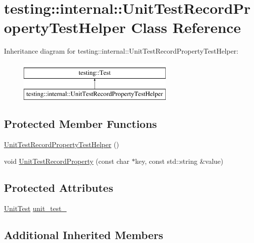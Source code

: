 \hypertarget{classtesting_1_1internal_1_1UnitTestRecordPropertyTestHelper}{}\section{testing\+::internal\+::Unit\+Test\+Record\+Property\+Test\+Helper Class Reference}
\label{classtesting_1_1internal_1_1UnitTestRecordPropertyTestHelper}
Inheritance diagram for testing\+::internal\+::Unit\+Test\+Record\+Property\+Test\+Helper\+:\begin{figure}[H]
\begin{center}
\leavevmode
\includegraphics[height=2.000000cm]{classtesting_1_1internal_1_1UnitTestRecordPropertyTestHelper}
\end{center}
\end{figure}
\subsection*{Protected Member Functions}
\begin{DoxyCompactItemize}
\item 
\mbox{\hyperlink{classtesting_1_1internal_1_1UnitTestRecordPropertyTestHelper_aa2bdfe52eb2aab5233ce9118917a4750}{Unit\+Test\+Record\+Property\+Test\+Helper}} ()
\item 
void \mbox{\hyperlink{classtesting_1_1internal_1_1UnitTestRecordPropertyTestHelper_a9c5432d080faf13a1db6baff0a2944f4}{Unit\+Test\+Record\+Property}} (const char $\ast$key, const std\+::string \&value)
\end{DoxyCompactItemize}
\subsection*{Protected Attributes}
\begin{DoxyCompactItemize}
\item 
\mbox{\hyperlink{classtesting_1_1UnitTest}{Unit\+Test}} \mbox{\hyperlink{classtesting_1_1internal_1_1UnitTestRecordPropertyTestHelper_a415e13a354d3b8bd97db96aae5ef5df1}{unit\+\_\+test\+\_\+}}
\end{DoxyCompactItemize}
\subsection*{Additional Inherited Members}


